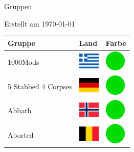 \documentclass[12pt, a4paper, twoside]{report}
\begin{document}
	
	\begin{center}
		\vspace{1cm}
		{\Large Gruppen\par}
		
		{\large Erstellt am \today\par}
	\end{center}
	
	\begin{center}
		\begin{longtable}{|p{5cm}|p{2cm}|p{2cm}|} 
			
			\hline
			\rowcolor{lightgray} Gruppe & Land & Farbe \\ \hline
			\endhead
 1000Mods                                                   & \includegraphics[width=1cm]{../4x3/gr} &   \includegraphics[width=1cm]{../likes/y} \\ \hline
 5 Stabbed 4 Corpses                                        & \includegraphics[width=1cm]{../4x3/de} &   \includegraphics[width=1cm]{../likes/y} \\ \hline
 Abbath                                                     & \includegraphics[width=1cm]{../4x3/no} &   \includegraphics[width=1cm]{../likes/y} \\ \hline
 Aborted                                                    & \includegraphics[width=1cm]{../4x3/be} &   \includegraphics[width=1cm]{../likes/y} \\ \hline

\end{longtable}
\end{center}
\end{document}

